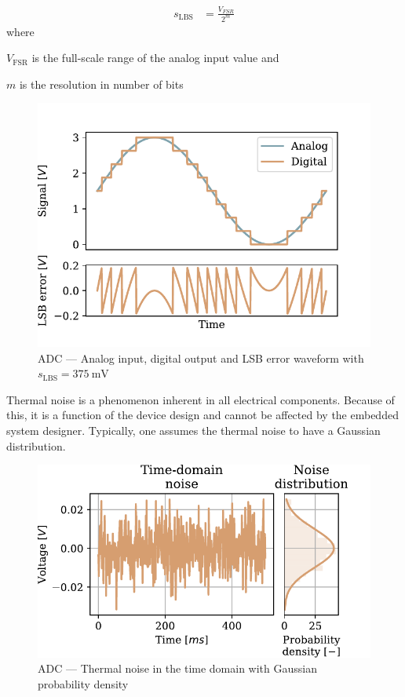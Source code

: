 \begin{align}
  s_\text{LBS} &= \frac{V_{FSR}}{2^m}
\end{align}
where
\begin{description}[topsep=0ex, noitemsep]
  \item $V_{\text{FSR}}$ is the full-scale range of the analog input value and
  \item $m$ is the resolution in number of bits
\end{description}

\begin{figure}[!htb]
  \centering
  \includegraphics[scale=0.72]{figures/electronics/adc/plot_lsberr}
  \caption[ADC LSB waveform]{\ac{ADC} --- Analog input, digital output and \ac{LSB} error waveform with $s_\text{LBS} = \SI{375}{\milli\volt}$\cite{hall2020fund}%
    \label{fig:plot_lsberr}}
\end{figure}

Thermal noise is a phenomenon inherent in all electrical components. Because of this, it is a function of the device design and cannot be affected by the embedded system designer. Typically, one assumes the thermal noise to have a Gaussian distribution.

\begin{figure}
  \centering
  \includegraphics[scale=0.72]{figures/electronics/adc/plot_thermerr}
  \caption[ADC thermal noise]{ADC --- Thermal noise in the time domain with Gaussian probability density~\cite{hall2020fund}%
    \label{fig:plot_themerr}}
\end{figure}
